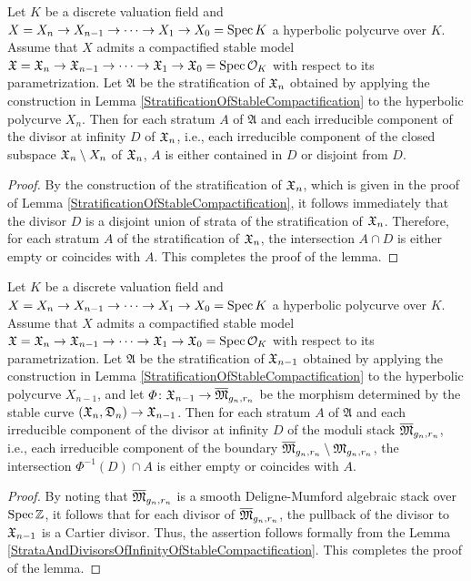 \begin{lem}\label{StrataAndDivisorsOfInfinityOfStableCompactification}
  Let $K$ be a discrete valuation field and $X = X_n \to X_{n - 1} \to \cdots \to X_1 \to X_0 = \mathrm{Spec} \, K$ a hyperbolic polycurve over $K$. Assume that $X$ admits a compactified stable model $\mathfrak{X} = \mathfrak{X}_n \to \mathfrak{X}_{n - 1} \to \cdots \to \mathfrak{X}_1 \to \mathfrak{X}_0 = \mathrm{Spec} \, \mathcal{O}_K$ with respect to its parametrization. Let $\mathfrak{A}$ be the stratification of $\mathfrak{X}_n$ obtained by applying the construction in Lemma \ref{StratificationOfStableCompactification} to the hyperbolic polycurve $X_n$. Then for each stratum $A$ of $\mathfrak{A}$ and each irreducible component of the divisor at infinity $D$ of $\mathfrak{X}_n$, i.e., each irreducible component of the closed subspace $\mathfrak{X}_n \setminus X_n$ of $\mathfrak{X}_n$, $A$ is either contained in $D$ or disjoint from $D$.
\end{lem}
\begin{proof}
  By the construction of the stratification of $\mathfrak{X}_n$, which is given in the proof of Lemma \ref{StratificationOfStableCompactification}, it follows immediately that the divisor $D$ is a disjoint union of strata of the stratification of $\mathfrak{X}_n$. Therefore, for each stratum $A$ of the stratification of $\mathfrak{X}_n$, the intersection $A \cap D$ is either empty or coincides with $A$. This completes the proof of the lemma.
\end{proof}

\begin{lem}\label{StrataAndDivisorsOfInfinityOfModuliStack}
  Let $K$ be a discrete valuation field and $X = X_n \to X_{n - 1} \to \cdots \to X_1 \to X_0 = \mathrm{Spec} \, K$ a hyperbolic polycurve over $K$. Assume that $X$ admits a compactified stable model $\mathfrak{X} = \mathfrak{X}_n \to \mathfrak{X}_{n - 1} \to \cdots \to \mathfrak{X}_1 \to \mathfrak{X}_0 = \mathrm{Spec} \, \mathcal{O}_K$ with respect to its parametrization. Let $\mathfrak{A}$ be the stratification of $\mathfrak{X}_{n - 1}$ obtained by applying the construction in Lemma \ref{StratificationOfStableCompactification} to the hyperbolic polycurve $X_{n - 1}$, and let $\varPhi \colon \mathfrak{X}_{n - 1} \to \overline{\mathfrak{M}}_{g_n, r_n}$ be the morphism determined by the stable curve $(\mathfrak{X}_n, \mathfrak{D}_n) \to \mathfrak{X}_{n - 1}$. Then for each stratum $A$ of $\mathfrak{A}$ and each irreducible component of the divisor at infinity $D$ of the moduli stack $\overline{\mathfrak{M}}_{g_n, r_n}$, i.e., each irreducible component of the boundary $\overline{\mathfrak{M}}_{g_n, r_n} \setminus \mathfrak{M}_{g_n, r_n}$, the intersection $\varPhi^{-1}(D) \cap A$ is either empty or coincides with $A$.
\end{lem}
\begin{proof}
  By noting that $\overline{\mathfrak{M}}_{g_n, r_n}$ is a smooth Deligne-Mumford algebraic stack over $\mathrm{Spec} \, \mathbb{Z}$, it follows that for each divisor of $\overline{\mathfrak{M}}_{g_n, r_n}$, the pullback of the divisor to $\mathfrak{X}_{n - 1}$ is a Cartier divisor. Thus, the assertion follows formally from the Lemma \ref{StrataAndDivisorsOfInfinityOfStableCompactification}. This completes the proof of the lemma.
\end{proof}   


